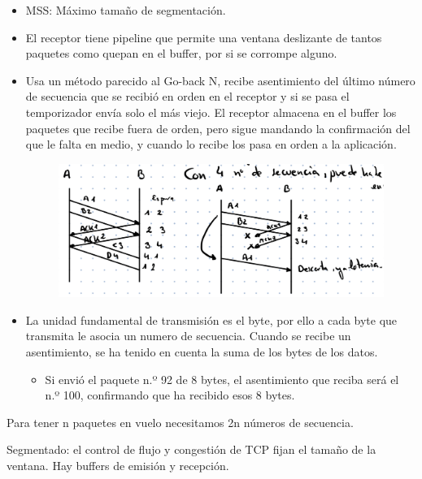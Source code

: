 \documentclass[12pt, twoside, openright]{report} %
\begin{document}
    \begin{itemize}
    \item
      MSS: Máximo tamaño de segmentación.
    \item
      El receptor tiene pipeline que permite una ventana deslizante de
      tantos paquetes como quepan en el buffer, por si se corrompe
      alguno.
    \item
      Usa un método parecido al Go-back N, recibe asentimiento del
      último número de secuencia que se recibió en orden en el receptor
      y si se pasa el temporizador envía solo el más viejo. El receptor
      almacena en el buffer los paquetes que recibe fuera de orden, pero
      sigue mandando la confirmación del que le falta en medio, y cuando
      lo recibe los pasa en orden a la aplicación.

	  \begin{figure}[H]
		{\includegraphics[scale=.25]{Untitled 3.png}}
	\end{figure}
    \item
      La unidad fundamental de transmisión es el byte, por ello a cada
      byte que transmita le asocia un numero de secuencia. Cuando se
      recibe un asentimiento, se ha tenido en cuenta la suma de los
      bytes de los datos.

      \begin{itemize}
      \item
        Si envió el paquete n.º 92 de 8 bytes, el asentimiento que reciba
        será el n.º 100, confirmando que ha recibido esos 8 bytes.
      \end{itemize}
    \end{itemize}

	Para tener n paquetes en vuelo necesitamos 2n números de secuencia.

	Segmentado: el control de flujo y congestión de TCP fijan el tamaño
    de la ventana. Hay buffers de emisión y recepción.
\end{document}
